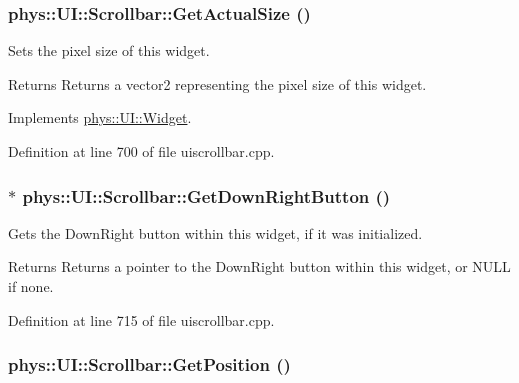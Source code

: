 \hypertarget{classphys_1_1UI_1_1Scrollbar_a2b3d791cbbe4c787f284d8b12a0edf27}{
\subsubsection[{GetActualSize}]{ phys::UI::Scrollbar::GetActualSize ()}}
\label{d0/d3e/classphys_1_1UI_1_1Scrollbar_a2b3d791cbbe4c787f284d8b12a0edf27}


Sets the pixel size of this widget. 

\begin{DoxyReturn}{Returns}
Returns a vector2 representing the pixel size of this widget. 
\end{DoxyReturn}


Implements \hyperlink{classphys_1_1UI_1_1Widget_af3a685621ed220748c0940ea38c96ed2}{phys::UI::Widget}.



Definition at line 700 of file uiscrollbar.cpp.

\hypertarget{classphys_1_1UI_1_1Scrollbar_abf733d00087050d575fca1abc2d4ba0e}{
\subsubsection[{GetDownRightButton}]{ $\ast$ phys::UI::Scrollbar::GetDownRightButton ()}}
\label{d0/d3e/classphys_1_1UI_1_1Scrollbar_abf733d00087050d575fca1abc2d4ba0e}


Gets the DownRight button within this widget, if it was initialized. 

\begin{DoxyReturn}{Returns}
Returns a pointer to the DownRight button within this widget, or NULL if none. 
\end{DoxyReturn}


Definition at line 715 of file uiscrollbar.cpp.

\hypertarget{classphys_1_1UI_1_1Scrollbar_ad049af26ff2247cfcd988cb5639fa003}{
\subsubsection[{GetPosition}]{ phys::UI::Scrollbar::GetPosition ()}}
\label{d0/d3e/classphys_1_1UI_1_1Scrollbar_ad049af26ff2247cfcd988cb5639fa003}


